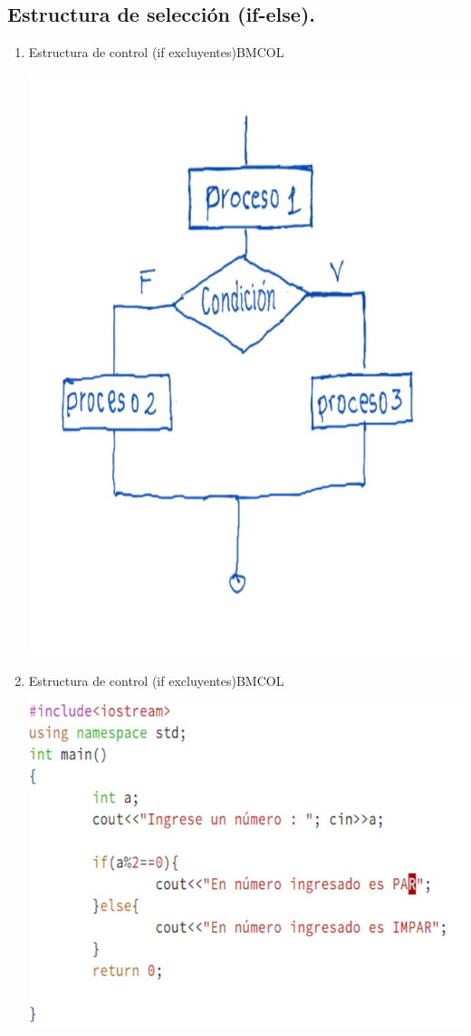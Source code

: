 \documentclass[presentation, aspectratio=54]{beamer}
\begin{document}
\subsection{Estructura de selección (if-else).}
\label{sec:org9086fd2}
\begin{enumerate}
\item Estructura de control (if excluyentes)\hfill{}\textsc{BMCOL}
\label{sec:org3250774}
\begin{center}
\includegraphics[width=.9\linewidth]{./images/codigo/ifsino.png}
\end{center}
\item Estructura de control (if excluyentes)\hfill{}\textsc{BMCOL}
\label{sec:org9f47416}
\begin{center}
\includegraphics[width=.9\linewidth]{./images/codigo/code-ifsino.png}
\end{center}
\end{enumerate}
\end{document}
